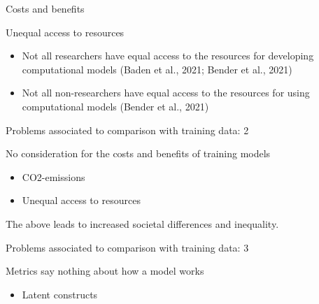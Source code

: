 \documentclass[compress]{beamer}
\begin{document}
\begin{frame}[fragile]{Costs and benefits} 	
	\begin{alertblock}{Unequal access to resources}
		\begin{itemize}
			\item Not all researchers have equal access to the resources for developing computational models (Baden et al., 2021; Bender et al., 2021)
			\item Not all non-researchers have equal access to the resources for using computational models (Bender et al., 2021)
		\end{itemize}
	\end{alertblock}
\end{frame}


\begin{frame}[fragile]{Problems associated to comparison with training data: 2} 	
	\begin{alertblock}{No consideration for the costs and benefits of training models}
		\begin{itemize}
			\item CO2-emissions
			\item Unequal access to resources
		\end{itemize}
	\end{alertblock}
The above leads to increased societal differences and inequality.
\end{frame}


\begin{frame}[fragile]{Problems associated to comparison with training data: 3} 	
	\begin{alertblock}{Metrics say nothing about how a model works}
		\begin{itemize}
			\item Latent constructs
		\end{itemize}
	\end{alertblock}
\end{frame}
\end{document}
